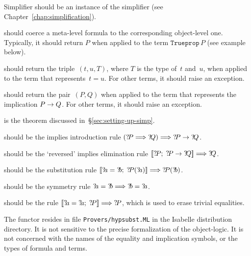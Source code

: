 \begin{ttdescription}
\item[Simplifier] should be an instance of the simplifier (see
  Chapter~\ref{chap:simplification}).
  
\item[\ttindexbold{dest_Trueprop}] should coerce a meta-level formula to the
  corresponding object-level one.  Typically, it should return $P$ when
  applied to the term $\texttt{Trueprop}\,P$ (see example below).
  
\item[\ttindexbold{dest_eq}] should return the triple~$(t,u,T)$, where $T$ is
  the type of~$t$ and~$u$, when applied to the \ML{} term that
  represents~$t=u$.  For other terms, it should raise an exception.
  
\item[\ttindexbold{dest_imp}] should return the pair~$(P,Q)$ when applied to
  the \ML{} term that represents the implication $P\rightarrow Q$.  For other terms,
  it should raise an exception.

\item[\tdxbold{eq_reflection}] is the theorem discussed
  in~\S\ref{sec:setting-up-simp}. 

\item[\tdxbold{imp_intr}] should be the implies introduction
rule $({?\!P}\Longrightarrow{?\!Q})\Longrightarrow {?\!P}\rightarrow{?\!Q}$.

\item[\tdxbold{rev_mp}] should be the `reversed' implies elimination
rule $\mathopen{[\![}{?\!P};  \;{?\!P}\rightarrow{?\!Q}\mathclose{]\!]} \Longrightarrow {?\!Q}$.

\item[\tdxbold{subst}] should be the substitution rule
$\List{\Var{a}=\Var{b};\; \Var{P}(\Var{a})} \Imp \Var{P}(\Var{b})$.

\item[\tdxbold{sym}] should be the symmetry rule
${?\!a}={?\!b}\Longrightarrow{?\!b}={?\!a}$.

\item[\tdxbold{thin_refl}] should be the rule
$\mathopen{[\![}{?\!a}={?\!a};\; {?\!P}\mathclose{]\!]} \Longrightarrow {?\!P}$, which is used to erase
trivial equalities.
\end{ttdescription}
%
The functor resides in file \texttt{Provers/hypsubst.ML} in the Isabelle
distribution directory.  It is not sensitive to the precise formalization
of the object-logic.  It is not concerned with the names of the equality
and implication symbols, or the types of formula and terms.  

